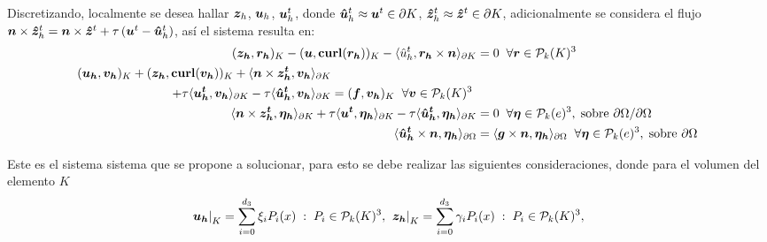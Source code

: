 \documentclass{article}
\begin{document}
\noindent Discretizando, localmente se desea hallar $\boldsymbol{z}_h$, $\boldsymbol{u}_h$, $\boldsymbol{u}^t_h$, donde $\boldsymbol{\hat{u}}^t_h \approx \boldsymbol{u}^t \in \partial K$, $\boldsymbol{\hat{z}}^t_h \approx \boldsymbol{\hat{z}}^t \in \partial K$, adicionalmente se considera el flujo $\boldsymbol{n} \times \boldsymbol{\hat{z}}^t_h = \boldsymbol{n} \times \boldsymbol{\hat{z}}^t + \tau \left( \boldsymbol{u}^t - \boldsymbol{\hat{u}}^t_h \right)$, así el sistema resulta en: 
\begin{align}
\label{eq:1}
    \vol{\vect{z_h}}{\vect{r_h}} - \vol{\vect{u}}{\curl{r_h}} - \face{\hat{u}^t_h}{\vect{r_h} \times \vect{n}} &= 0
    	\hspace{2 mm}\forall \vect{r} \in \mathcal{P}_k(K)^3  \\
\begin{split}
    \vol{\vect{u_h}}{\vect{v_h}} + \vol{\vect{z_h}}{\curl{v_h}} + 
    \face{\vect{n} \times \vect{z_h^t}}{\vect{v_h}} &\\ 
    + \tau \face{\vect{u_h^t}}{\vect{v_h}} -\tau \face{\vect{\hat{u}_h^t}}{\vect{v_h}} 
    &= \vol{\vect{f}}{\vect{v_h}}
    	\hspace{2 mm}\forall \vect{v} \in \mathcal{P}_k(K)^3 
\end{split} \\
\label{eq:2}
    \face{\vect{n} \times \vect{z_h^t}}{\vect{\eta_h}} + \tau \face{\vect{u^t}}{\vect{\eta_h}} - \tau \face{\vect{\hat{u}^t_h}}{\vect{\eta_h}} &= 0
    \hspace{2 mm} \forall \vect{\eta} \in \mathcal{P}_k(e)^3, \hspace{1mm} \textup{sobre}~\partial \Omega/\partial \Omega \\ 
\label{eq:3}
    \frontier{\vect{\hat{u}^t_h} \times \vect{n}}{\vect{\eta_h}} &= \frontier{\vect{g} \times \vect{n}}{\vect{\eta_h}}
    	\hspace{2 mm} \forall \vect{\eta} \in \mathcal{P}_k(e)^3, \hspace{1mm} \textup{sobre}~\partial \Omega
\end{align}

\noindent Este es el sistema sistema que se propone a solucionar, para esto se debe realizar las siguientes consideraciones, donde para el volumen del elemento $K$
\begin{equation*}
    \left . \boldsymbol{u_h} \right |_K = \sum_{i=0}^{d_3} \xi_i P_i(x)
    \hspace{1mm} : \hspace{1mm} P_i \in \mathcal{P}_k(K)^3, 
    \hspace{1 mm}
    \left . \boldsymbol{z_h} \right |_K = \sum_{i=0}^{d_3} \gamma_i P_i(x)
    \hspace{1mm} : \hspace{1mm} P_i \in \mathcal{P}_k(K)^3,
\end{equation*}
\end{document}

